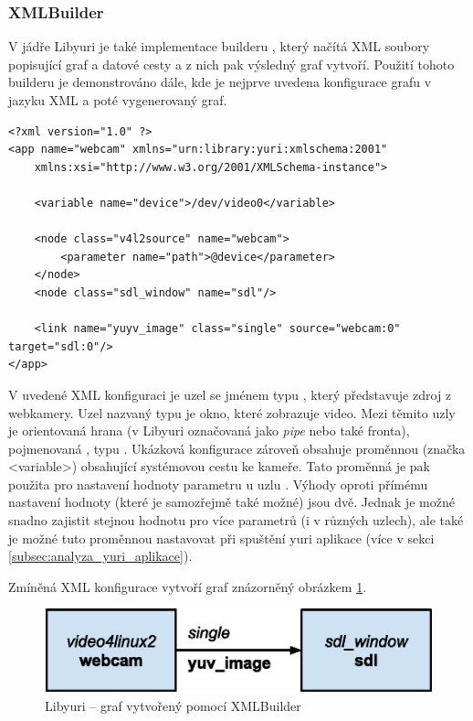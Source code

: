 \documentclass[thesis=M,czech]{FITthesis}[2012/06/26]
\begin{document}
\subsubsection{XMLBuilder} \label{subsec:analyza_yuri_vytvoreni_xml}
V jádře Libyuri je také implementace builderu , který načítá XML soubory popisující graf a datové cesty a z nich pak výsledný graf vytvoří. Použití tohoto builderu je demonstrováno dále, kde je nejprve uvedena konfigurace grafu v jazyku XML a poté vygenerovaný graf.
\\
\lstset{language=XML}
\begin{lstlisting}
<?xml version="1.0" ?>
<app name="webcam" xmlns="urn:library:yuri:xmlschema:2001"
    xmlns:xsi="http://www.w3.org/2001/XMLSchema-instance">

    <variable name="device">/dev/video0</variable>    

    <node class="v4l2source" name="webcam">
        <parameter name="path">@device</parameter>
    </node>
    <node class="sdl_window" name="sdl"/>

    <link name="yuyv_image" class="single" source="webcam:0" target="sdl:0"/>
</app>
\end{lstlisting}

V uvedené XML konfiguraci je uzel se jménem  typu , který představuje zdroj z webkamery. Uzel nazvaný  typu  je okno, které zobrazuje video. Mezi těmito uzly je orientovaná hrana (v Libyuri označovaná jako \textit{pipe} nebo také fronta), pojmenovaná , typu . Ukázková konfigurace zároveň obsahuje proměnnou (značka <variable>) obsahující systémovou cestu ke kameře. Tato proměnná je pak použita pro nastavení hodnoty parametru  u uzlu . Výhody oproti přímému nastavení hodnoty (které je samozřejmě také možné) jsou dvě. Jednak je možné snadno zajistit stejnou hodnotu pro více parametrů (i v různých uzlech), ale také je možné tuto proměnnou nastavovat při spuštění yuri aplikace (více v sekci \ref{subsec:analyza_yuri_aplikace}). 

Zmíněná XML konfigurace vytvoří graf znázorněný obrázkem \ref{img:yuri_vytvoreni_xml}.
\\
\begin{figure}[h]\centering
	\includegraphics[width=1\textwidth]{images/yuri_xml_graph.eps}
	\caption{Libyuri -- graf vytvořený pomocí XMLBuilder}\label{img:yuri_vytvoreni_xml}
\end{figure}
\end{document}

